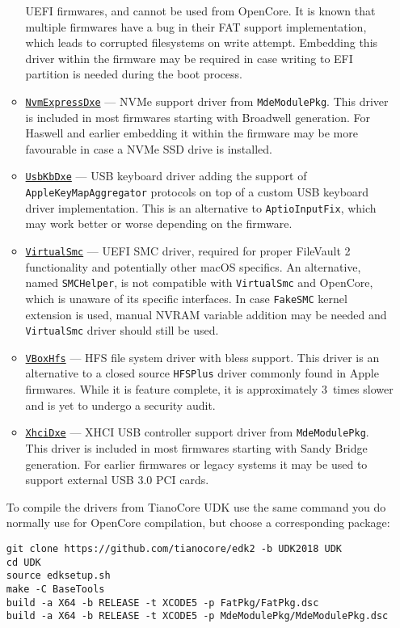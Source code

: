 \documentclass[]{article}
\begin{document}
\begin{enumerate}
\begin{itemize}
  UEFI firmwares, and cannot be used from OpenCore. It is known that multiple firmwares
  have a bug in their FAT support implementation, which leads to corrupted filesystems
  on write attempt.  Embedding this driver within the firmware may be required in case
  writing to EFI partition is needed during the boot process.
  \item \href{https://github.com/tianocore/edk2/tree/UDK2018}{\texttt{NvmExpressDxe}}
  --- NVMe support driver from \texttt{MdeModulePkg}. This driver is included in most
  firmwares starting with Broadwell generation. For Haswell and earlier embedding it
  within the firmware may be more favourable in case a NVMe SSD drive is installed.
  \item \href{https://github.com/acidanthera/AppleSupportPkg}{\texttt{UsbKbDxe}}
  --- USB keyboard driver adding the support of \texttt{AppleKeyMapAggregator} protocols
  on top of a custom USB keyboard driver implementation. This is an alternative to
  \texttt{AptioInputFix}, which may work better or worse depending on the firmware.
  \item \href{https://github.com/acidanthera/VirtualSMC}{\texttt{VirtualSmc}}
  --- UEFI SMC driver, required for proper FileVault 2 functionality and potentially
  other macOS specifics. An alternative, named \texttt{SMCHelper}, is not compatible
  with \texttt{VirtualSmc} and OpenCore, which is unaware of its specific interfaces.
  In case \texttt{FakeSMC} kernel extension is used, manual NVRAM variable addition
  may be needed and \texttt{VirtualSmc} driver should still be used.
  \item \href{https://github.com/acidanthera/AppleSupportPkg}{\texttt{VBoxHfs}}
  --- HFS file system driver with bless support. This driver is an alternative to
  a closed source \texttt{HFSPlus} driver commonly found in Apple firmwares. While
  it is feature complete, it is approximately 3~times slower and is yet to undergo
  a security audit.
  \item \href{https://github.com/tianocore/edk2/tree/UDK2018}{\texttt{XhciDxe}}
  --- XHCI USB controller support driver from \texttt{MdeModulePkg}. This driver is
  included in most firmwares starting with Sandy Bridge generation. For earlier firmwares
  or legacy systems it may be used to support external USB 3.0 PCI cards.
  \end{itemize}

  To compile the drivers from TianoCore UDK use the same command you do normally use
  for OpenCore compilation, but choose a corresponding package:
\begin{lstlisting}[label=compileudk, style=ocbash]
git clone https://github.com/tianocore/edk2 -b UDK2018 UDK
cd UDK
source edksetup.sh
make -C BaseTools
build -a X64 -b RELEASE -t XCODE5 -p FatPkg/FatPkg.dsc
build -a X64 -b RELEASE -t XCODE5 -p MdeModulePkg/MdeModulePkg.dsc
\end{lstlisting}


\end{enumerate}
\end{document}

